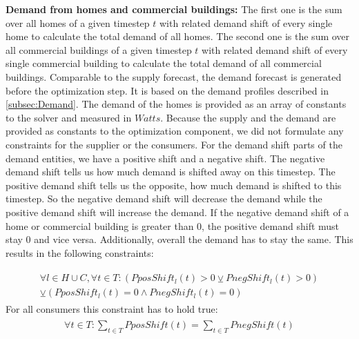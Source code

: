 \textbf{Demand from homes and commercial buildings:} The first one is the sum over all homes of a given timestep $t$ with related demand shift of every single home to calculate the total demand of all homes.
The second one is the sum over all commercial buildings of a given timestep $t$ with related demand shift of every single commercial building to calculate the total demand of all commercial buildings.
Comparable to the supply forecast, the demand forecast is generated before the optimization step. 
It is based on the demand profiles described in \cref{subsec:Demand}. 
The demand of the homes is provided as an array of constants to the solver and measured in $Watts$. 
Because the supply and the demand are provided as constants to the optimization component, we did not formulate any constraints for the supplier or the consumers.
For the demand shift parts of the demand entities, we have a positive shift and a negative shift.
The negative demand shift tells us how much demand is shifted away on this timestep.
The positive demand shift tells us the opposite, how much demand is shifted to this timestep.
So the negative demand shift will decrease the demand while the positive demand shift will increase the demand.
If the negative demand shift of a home or commercial building is greater than 0, the positive demand shift must stay 0 and vice versa. Additionally, overall the demand has to stay the same. 
This results in the following constraints:

\begin{align} \label{eq:shift}
\begin{split}
\forall l \in H\cup C, \forall t \in T: (PposShift_{l}(t) > 0 \veebar PnegShift_{l}(t) > 0)\\ \veebar (PposShift_{l}(t) = 0 \wedge PnegShift_{l}(t) = 0)
\end{split}
\end{align}
For all consumers this constraint has to hold true:
\begin{align} \label{eq:shiftSum}
\begin{split}
\forall t \in T: \sum\limits_{t\in T} PposShift(t) = \sum\limits_{t\in T} PnegShift(t)\\
\end{split}
\end{align}

